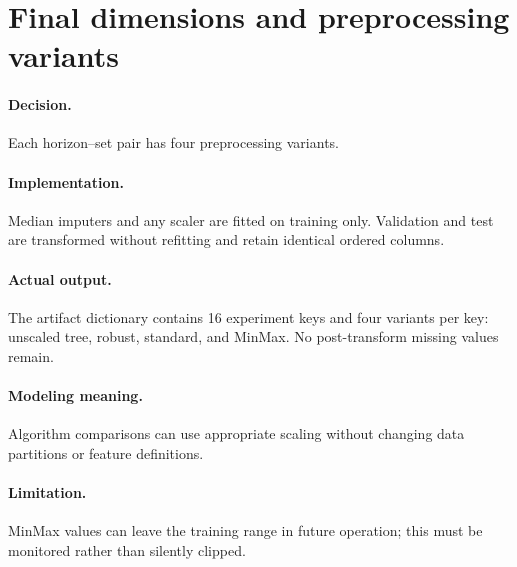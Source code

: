 \documentclass[10pt,a4paper]{article}
\newcommand{\decision}{\paragraph{Decision.}}
\newcommand{\implementation}{\paragraph{Implementation.}}
\newcommand{\actual}{\paragraph{Actual output.}}
\newcommand{\modelmeaning}{\paragraph{Modeling meaning.}}
\newcommand{\limitation}{\paragraph{Limitation.}}
\begin{document}
\section{Final dimensions and preprocessing variants}
\decision Each horizon--set pair has four preprocessing variants.
\implementation Median imputers and any scaler are fitted on training only. Validation and test are transformed without refitting and retain identical ordered columns.
\actual The artifact dictionary contains 16 experiment keys and four variants per key: unscaled tree, robust, standard, and MinMax. No post-transform missing values remain.
\modelmeaning Algorithm comparisons can use appropriate scaling without changing data partitions or feature definitions.
\limitation MinMax values can leave the training range in future operation; this must be monitored rather than silently clipped.
\end{document}
